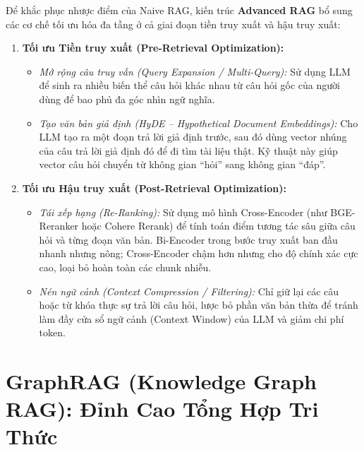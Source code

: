 \documentclass[12pt,a4paper]{report}
\begin{document}
Để khắc phục nhược điểm của Naive RAG, kiến trúc \textbf{Advanced RAG} bổ sung các cơ chế tối ưu hóa đa tầng ở cả giai đoạn tiền truy xuất và hậu truy xuất:
\begin{enumerate}[itemsep=2pt, parsep=0pt, topsep=3pt]
    \item \textbf{Tối ưu Tiền truy xuất (Pre-Retrieval Optimization):}
    \begin{itemize}[itemsep=1pt, parsep=0pt, topsep=2pt]
        \item \textit{Mở rộng câu truy vấn (Query Expansion / Multi-Query):} Sử dụng LLM để sinh ra nhiều biến thể câu hỏi khác nhau từ câu hỏi gốc của người dùng để bao phủ đa góc nhìn ngữ nghĩa.
        \item \textit{Tạo văn bản giả định (HyDE -- Hypothetical Document Embeddings):} Cho LLM tạo ra một đoạn trả lời giả định trước, sau đó dùng vector nhúng của câu trả lời giả định đó để đi tìm tài liệu thật. Kỹ thuật này giúp vector câu hỏi chuyển từ không gian “hỏi” sang không gian “đáp”.
    \end{itemize}
    \item \textbf{Tối ưu Hậu truy xuất (Post-Retrieval Optimization):}
    \begin{itemize}[itemsep=1pt, parsep=0pt, topsep=2pt]
        \item \textit{Tái xếp hạng (Re-Ranking):} Sử dụng mô hình Cross-Encoder (như BGE-Reranker hoặc Cohere Rerank) để tính toán điểm tương tác sâu giữa câu hỏi và từng đoạn văn bản. Bi-Encoder trong bước truy xuất ban đầu nhanh nhưng nông; Cross-Encoder chậm hơn nhưng cho độ chính xác cực cao, loại bỏ hoàn toàn các chunk nhiễu.
        \item \textit{Nén ngữ cảnh (Context Compression / Filtering):} Chỉ giữ lại các câu hoặc từ khóa thực sự trả lời câu hỏi, lược bỏ phần văn bản thừa để tránh làm đầy cửa sổ ngữ cảnh (Context Window) của LLM và giảm chi phí token.
    \end{itemize}
\end{enumerate}

\section{GraphRAG (Knowledge Graph RAG): Đỉnh Cao Tổng Hợp Tri Thức}
\end{document}
